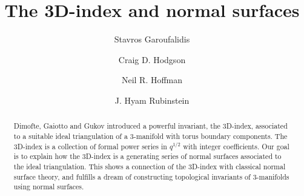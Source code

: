 \documentclass[12pt,reqno]{amsart}  %
\theoremstyle{definition}
\theoremstyle{remark}
\begin{document}

\title[The 3D-index and normal surfaces]{The 3D-index and normal surfaces}
\author{Stavros Garoufalidis}
\address{School of Mathematics\\
Georgia Institute of Technology\\
Atlanta, Georgia 30332-0160, USA}

\author{Craig D. Hodgson}
\address{School of Mathematics and Statistics \\
         The University of Melbourne \\
         Parkville, VIC, 3010, AUSTRALIA
         }
\author{Neil R. Hoffman}
\address{School of Mathematics and Statistics \\
         The University of Melbourne \\
         Parkville, VIC, 3010, AUSTRALIA
         }

\author{J. Hyam Rubinstein}
\address{School of Mathematics and Statistics \\
         The University of Melbourne \\
         Parkville, VIC, 3010, AUSTRALIA
         }

\begin{abstract}
Dimofte, Gaiotto and Gukov introduced a powerful invariant, the 3D-index,
associated to a suitable ideal triangulation of a 3-manifold with torus
boundary components. The 3D-index is a collection of formal power series
in $q^{1/2}$ with integer coefficients. Our goal is to explain how the 
3D-index is a generating series of normal surfaces associated to the
ideal triangulation. This shows a connection of the 3D-index with
classical normal surface theory, and fulfills a dream of constructing 
topological invariants of 3-manifolds using normal surfaces.
\end{abstract}

\maketitle
\tableofcontents

\end{document}
